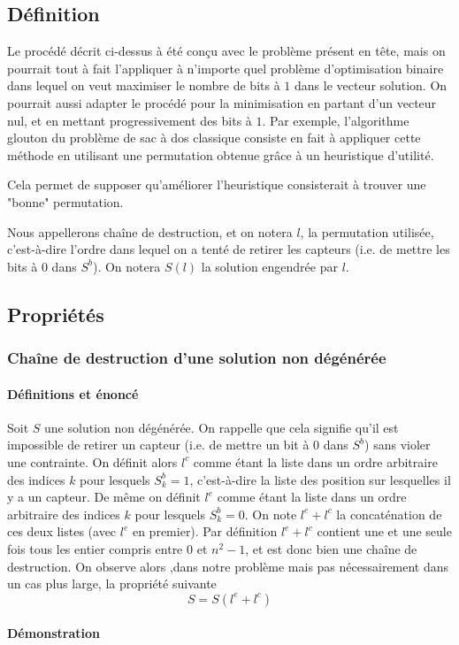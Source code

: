 \documentclass[12pt,a4paper]{article}
\begin{document}
\subsection{Définition}
Le procédé décrit ci-dessus à été conçu avec le problème présent en tête, mais on pourrait tout à fait l'appliquer à n'importe quel problème d'optimisation binaire dans lequel on veut maximiser le nombre de bits à $1$ dans le vecteur solution. On pourrait aussi adapter le procédé pour la minimisation en partant d'un vecteur nul, et en mettant progressivement des bits à $1$. Par exemple, l'algorithme glouton du problème de sac à dos classique consiste en fait à appliquer cette méthode en utilisant une permutation obtenue grâce à un heuristique d'utilité.

Cela permet de supposer qu'améliorer l'heuristique consisterait à trouver une "bonne" permutation. 

Nous appellerons chaîne de destruction, et on notera $l$, la permutation utilisée, c'est-à-dire l'ordre dans lequel on a tenté de retirer les capteurs (i.e. de mettre les bits à 0 dans $S^b$). On notera $S(l)$ la solution engendrée par $l$.
\subsection{Propriétés}
\subsubsection{Chaîne de destruction d'une solution non dégénérée}
\paragraph{Définitions et énoncé} 
Soit $S$ une solution non dégénérée. On rappelle que cela signifie qu'il est impossible de retirer un capteur (i.e. de mettre un bit à $0$ dans $S^b$) sans violer une contrainte. On définit alors $l^c$ comme étant la liste dans un ordre arbitraire des indices $k$ pour lesquels $S^b_k=1$, c'est-à-dire la liste des position sur lesquelles il y a un capteur. De même on définit $l^e$ comme étant la liste dans un ordre arbitraire des indices $k$ pour lesquels $S^b_k=0$. On note $l^e+l^c$ la concaténation de ces deux listes (avec $l^e$ en premier). Par définition $l^e+l^c$ contient une et une seule fois tous les entier compris entre $0$ et $n^2-1$, et est donc bien une chaîne de destruction. On observe alors ,dans notre problème mais pas nécessairement dans un cas plus large, la propriété suivante
\[S=S(l^e+l^c)\]
\paragraph{Démonstration}
\end{document}
